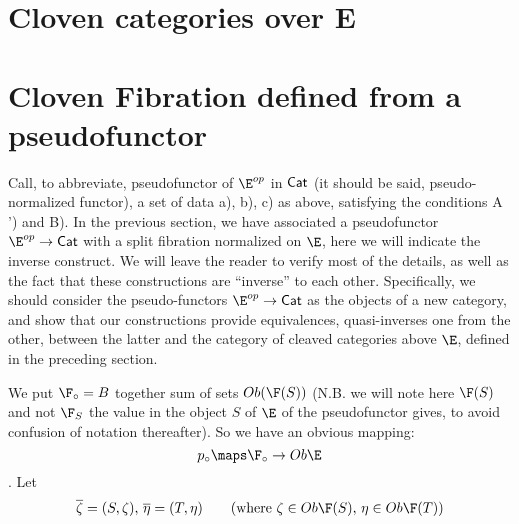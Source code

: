 \section{Cloven categories over E}

\section{Cloven Fibration defined from a pseudofunctor}

Call, to abbreviate, pseudofunctor of $\E^{op}$ in $\mathsf{Cat}$ (it should be said, pseudo-normalized functor), a set of data a), b), c) as above, satisfying the conditions A ') and B). 
In the previous section, we have associated a pseudofunctor $\E^{op} \to \Cat$ with a split fibration normalized on $\E$, here we will indicate the inverse construct. 
We will leave the reader to verify most of the details, as well as the fact that these constructions are ``inverse'' to each other. 
Specifically, we should consider the pseudo-functors $\E^{op} \to \Cat$ as the objects of a new category, and show that our constructions provide equivalences, quasi-inverses one from the other, between the latter and the category of cleaved categories above $\E$, defined in the preceding section.

We put $\F_\circ = B$ together sum of sets $Ob(\F (S))$ (N.B. we will note here $\F(S)$ and not $\F_S$ the value in the object $S$ of $\E$ of the pseudofunctor gives, to avoid confusion of notation thereafter). So we have an obvious mapping: 
\[p_\circ \maps \F_\circ \to Ob \E\]. 
Let 
\[\overline\zeta = (S, \zeta), \, \overline \eta = (T, \eta) \qquad (\text{where } \zeta \in Ob\F(S), \, \eta \in Ob\F(T))\]

